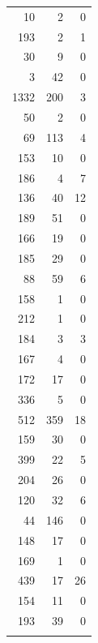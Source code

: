\documentclass[letterpaper,11pt]{article}
\begin{document}
\begin{longtable}{rrr}
   10 &   2 &   0 \\ 
  193 &   2 &   1 \\ 
   30 &   9 &   0 \\ 
    3 &  42 &   0 \\ 
  1332 & 200 &   3 \\ 
   50 &   2 &   0 \\ 
   69 & 113 &   4 \\ 
  153 &  10 &   0 \\ 
  186 &   4 &   7 \\ 
  136 &  40 &  12 \\ 
  189 &  51 &   0 \\ 
  166 &  19 &   0 \\ 
  185 &  29 &   0 \\ 
   88 &  59 &   6 \\ 
  158 &   1 &   0 \\ 
  212 &   1 &   0 \\ 
  184 &   3 &   3 \\ 
  167 &   4 &   0 \\ 
  172 &  17 &   0 \\ 
  336 &   5 &   0 \\ 
  512 & 359 &  18 \\ 
  159 &  30 &   0 \\ 
  399 &  22 &   5 \\ 
  204 &  26 &   0 \\ 
  120 &  32 &   6 \\ 
   44 & 146 &   0 \\ 
  148 &  17 &   0 \\ 
  169 &   1 &   0 \\ 
  439 &  17 &  26 \\ 
  154 &  11 &   0 \\ 
  193 &  39 &   0 \\ 
   \hline
\hline
\label{ppxtab}
\end{longtable}
\end{document}
